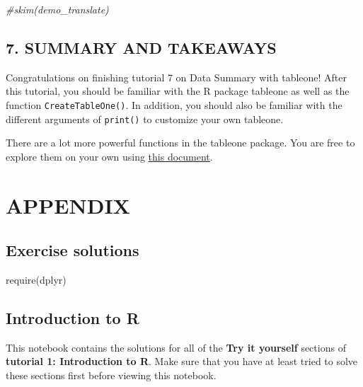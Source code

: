 \documentclass[
]{book}
\newenvironment{Shaded}{\begin{snugshade}}{\end{snugshade}}
\newcommand{\CommentTok}[1]{\textcolor[rgb]{0.56,0.35,0.01}{\textit{#1}}}
\newcommand{\FunctionTok}[1]{\textcolor[rgb]{0.00,0.00,0.00}{#1}}
\newcommand{\NormalTok}[1]{#1}
\begin{document}
\begin{Shaded}
\begin{Highlighting}[]
\CommentTok{\#skim(demo\_translate)}
\end{Highlighting}
\end{Shaded}

\hypertarget{summary-and-takeaways-2}{%
\section{7. SUMMARY AND TAKEAWAYS}\label{summary-and-takeaways-2}}

Congratulations on finishing tutorial 7 on Data Summary with tableone! After this tutorial, you should be familiar with the R package tableone as well as the function \texttt{CreateTableOne()}. In addition, you should also be familiar with the different arguments of \texttt{print()} to customize your own tableone.

There are a lot more powerful functions in the tableone package. You are free to explore them on your own using \href{https://cran.r-project.org/web/packages/tableone/vignettes/introduction.htmlhttps://cran.r-project.org/web/packages/tableone/vignettes/introduction.html}{this document}.

\backmatter
\setcounter{chapter}{0}
\renewcommand{\thechapter}{\Alph{chapter}}

\hypertarget{appendix}{%
\chapter{APPENDIX}\label{appendix}}

\hypertarget{exercise-solutions}{%
\section{Exercise solutions}\label{exercise-solutions}}

\begin{Shaded}
\begin{Highlighting}[]
\FunctionTok{require}\NormalTok{(dplyr)}
\end{Highlighting}
\end{Shaded}

\hypertarget{introduction-to-r-1}{%
\section{Introduction to R}\label{introduction-to-r-1}}

This notebook contains the solutions for all of the \textbf{Try it yourself} sections of \textbf{tutorial 1: Introduction to R}. Make sure that you have at least tried to solve these sections first before viewing this notebook.
\end{document}
